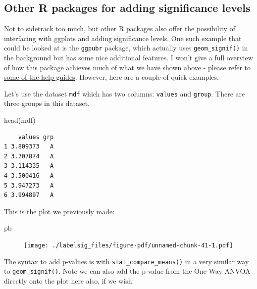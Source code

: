 \documentclass[
  letterpaper,
  DIV=11,
  numbers=noendperiod]{scrreprt}
\newenvironment{Shaded}{\begin{snugshade}}{\end{snugshade}}
\newcommand{\FunctionTok}[1]{\textcolor[rgb]{0.28,0.35,0.67}{#1}}
\newcommand{\NormalTok}[1]{\textcolor[rgb]{0.00,0.23,0.31}{#1}}
\begin{document}
\hypertarget{other-r-packages-for-adding-significance-levels}{%
\subsection{\texorpdfstring{\textbf{Other R packages for adding
significance
levels}}{Other R packages for adding significance levels}}\label{other-r-packages-for-adding-significance-levels}}

Not to sidetrack too much, but other R packages also offer the
possibility of interfacing with ggplots and adding significance levels.
One such example that could be looked at is the \texttt{ggpubr} package,
which actually uses \texttt{geom\_signif()} in the background but has
some nice additional features. I won't give a full overview of how this
package achieves much of what we have shown above - please refer to
\href{http://www.sthda.com/english/articles/24-ggpubr-publication-ready-plots/76-add-p-values-and-significance-levels-to-ggplots/}{some
of the help guides}. However, here are a couple of quick examples.

Let's use the dataset \texttt{mdf} which has two columns:
\texttt{values} and \texttt{group}. There are three groups in this
dataset.

\begin{Shaded}
\begin{Highlighting}[]
\FunctionTok{head}\NormalTok{(mdf)}
\end{Highlighting}
\end{Shaded}

\begin{verbatim}
    values grp
1 3.809373   A
2 3.707874   A
3 3.114335   A
4 3.500416   A
5 3.947273   A
6 3.994897   A
\end{verbatim}

This is the plot we previously made:

\begin{Shaded}
\begin{Highlighting}[]
\NormalTok{pb}
\end{Highlighting}
\end{Shaded}

\begin{figure}[H]

{\centering \texttt{[image: ./labelsig\_files/figure-pdf/unnamed-chunk-41-1.pdf]}

}

\end{figure}

The syntax to add p-values is with \texttt{stat\_compare\_means()} in a
very similar way to \texttt{geom\_signif()}. Note we can also add the
p-value from the One-Way ANVOA directly onto the plot here also, if we
wish:
\end{document}
